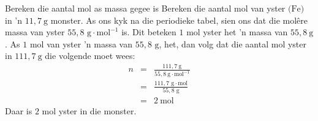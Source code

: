       \begin{wex}{Bereken die aantal mol as massa gegee is}{
      \label{m38717*id276776} Bereken die aantal mol van yster $\text{(Fe)}$ in  'n $11,7 ~\text{g}$ monster.  }
{
As ons kyk na die periodieke tabel, sien ons dat die molêre massa van yster $55,8 \text{ g} \cdot \text{mol}^{-1}$ is. Dit beteken $1$ mol yster het  'n massa van $55,8 ~\text{g}$.
      \label{m38717*id276848}As $1$ mol van yster  'n massa van $55,8 \text{ g}$, het, dan volg dat die aantal mol yster in $111,7 ~\text{g}$  die volgende moet wees: 
\begin{eqnarray*}
n & = & \frac{111,7 ~\text{g}}{55,8 ~\text{g} \cdot{\text{mol}}^{-1}} \\
 & = & \frac{111,7 \text{ g} \cdot \text{mol}}{55,8 \text{ g}} \\
 & = & 2 ~\text{mol}
\end{eqnarray*}
Daar is $2$ mol yster in die monster.
}
    \end{wex}

